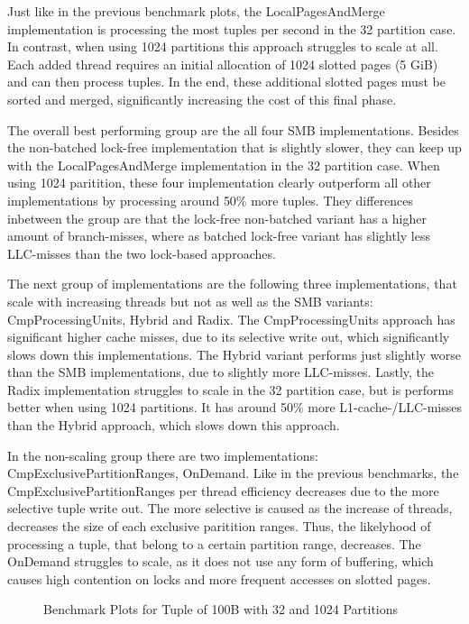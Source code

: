 Just like in the previous benchmark plots, the LocalPagesAndMerge implementation is processing the most tuples per second in the 32 partition case.
In contrast, when using 1024 partitions this approach struggles to scale at all.
Each added thread requires an initial allocation of 1024 slotted pages (5 GiB) and can then process tuples.
In the end, these additional slotted pages must be sorted and merged, significantly increasing the cost of this final phase.

The overall best performing group are the all four \ac{SMB} implementations.
Besides the non-batched lock-free implementation that is slightly slower, they can keep up with the LocalPagesAndMerge implementation in the 32 partition case.
When using 1024 paritition, these four implementation clearly outperform all other implementations by processing around 50\% more tuples.
They differences inbetween the group are that the lock-free non-batched variant has a higher amount of branch-misses, where as batched lock-free variant has slightly less \ac{LLC}-misses than the two lock-based approaches.

The next group of implementations are the following three implementations, that scale with increasing threads but not as well as the \ac{SMB} variants: CmpProcessingUnits, Hybrid and Radix.
The CmpProcessingUnits approach has significant higher cache misses, due to its selective write out, which significantly slows down this implementations.
The Hybrid variant performs just slightly worse than the \ac{SMB} implementations, due to slightly more \ac{LLC}-misses.
Lastly, the Radix implementation struggles to scale in the 32 partition case, but is performs better when using 1024 partitions.
It has around 50\% more L1-cache-/\ac{LLC}-misses than the Hybrid approach, which slows down this approach.

In the non-scaling group there are two implementations: CmpExclusivePartitionRanges, OnDemand.
Like in the previous benchmarks, the CmpExclusivePartitionRanges per thread efficiency decreases due to the more selective tuple write out.
The more selective is caused as the increase of threads, decreases the size of each exclusive paritition ranges.
Thus, the likelyhood of processing a tuple, that belong to a certain partition range, decreases.
The OnDemand struggles to scale, as it does not use any form of buffering, which causes high contention on locks and more frequent accesses on slotted pages.

\begin{figure}[h]
  \centering
  \begin{subfigure}{.49\textwidth}
    \centering
    \resizebox{\linewidth}{!}{}
  \end{subfigure}
  \begin{subfigure}{.49\textwidth}
    \centering
    \resizebox{\linewidth}{!}{}
  \end{subfigure}
  \caption[Shuffle Benchmark Plots for Tuple of 100B with 32 and 1024 Partitions]{Benchmark Plots for Tuple of 100B with 32 and 1024 Partitions}
  \label{plot-shuffle-100B-32-1024}
\end{figure}

